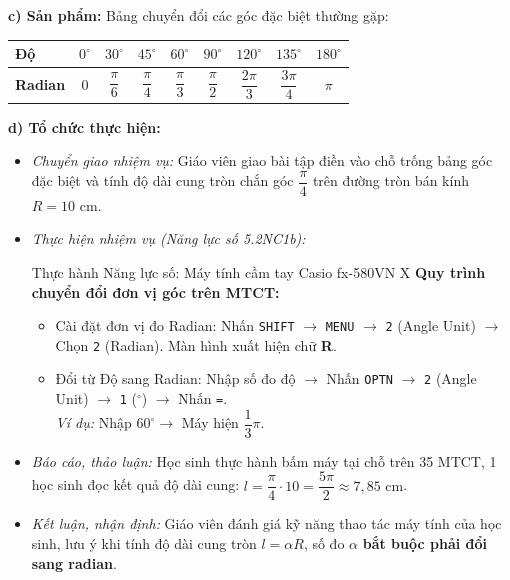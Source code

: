 \documentclass[12pt, a4paper]{article}
\begin{document}
\textbf{c) Sản phẩm:} Bảng chuyển đổi các góc đặc biệt thường gặp:
\begin{center}
\begin{tabular}{lcccccccc}
\toprule
\textbf{Độ} & $0^\circ$ & $30^\circ$ & $45^\circ$ & $60^\circ$ & $90^\circ$ & $120^\circ$ & $135^\circ$ & $180^\circ$ \\
\midrule
\textbf{Radian} & $0$ & $\dfrac{\pi}{6}$ & $\dfrac{\pi}{4}$ & $\dfrac{\pi}{3}$ & $\dfrac{\pi}{2}$ & $\dfrac{2\pi}{3}$ & $\dfrac{3\pi}{4}$ & $\pi$ \\
\bottomrule
\end{tabular}
\end{center}

\textbf{d) Tổ chức thực hiện:}
\begin{itemize}[leftmargin=0.6cm]
    \item \textit{Chuyển giao nhiệm vụ:} Giáo viên giao bài tập điền vào chỗ trống bảng góc đặc biệt và tính độ dài cung tròn chắn góc $\dfrac{\pi}{4}$ trên đường tròn bán kính $R = 10\text{ cm}$.
    \item \textit{Thực hiện nhiệm vụ (Năng lực số 5.2NC1b):}
    \begin{aibox}{Thực hành Năng lực số: Máy tính cầm tay Casio fx-580VN X}
        \textbf{Quy trình chuyển đổi đơn vị góc trên MTCT:}
        \begin{itemize}[leftmargin=0.5cm]
            \item Cài đặt đơn vị đo Radian: Nhấn \texttt{SHIFT} $\to$ \texttt{MENU} $\to$ \texttt{2} (Angle Unit) $\to$ Chọn \texttt{2} (Radian). Màn hình xuất hiện chữ \textbf{R}.
            \item Đổi từ Độ sang Radian: Nhập số đo độ $\to$ Nhấn \texttt{OPTN} $\to$ \texttt{2} (Angle Unit) $\to$ \texttt{1} ($^\circ$) $\to$ Nhấn \texttt{=}.\\
            \textit{Ví dụ:} Nhập $60^\circ \to$ Máy hiện $\dfrac{1}{3}\pi$.
        \end{itemize}
    \end{aibox}
    \item \textit{Báo cáo, thảo luận:} Học sinh thực hành bấm máy tại chỗ trên 35 MTCT, 1 học sinh đọc kết quả độ dài cung: $l = \dfrac{\pi}{4} \cdot 10 = \dfrac{5\pi}{2} \approx 7{,}85\text{ cm}$.
    \item \textit{Kết luận, nhận định:} Giáo viên đánh giá kỹ năng thao tác máy tính của học sinh, lưu ý khi tính độ dài cung tròn $l = \alpha R$, số đo $\alpha$ \textbf{bắt buộc phải đổi sang radian}.
\end{itemize}
\end{document}
